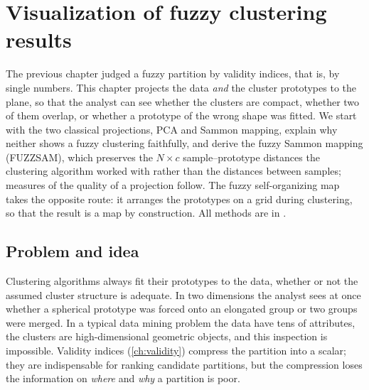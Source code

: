 \chapter[Visualization]{Visualization of fuzzy clustering results}\label{ch:visualization}
\begin{roadmap}
The previous chapter judged a fuzzy partition by validity indices, that is, by single numbers. This chapter projects the data \emph{and} the cluster prototypes to the plane, so that the analyst can see whether the clusters are compact, whether two of them overlap, or whether a prototype of the wrong shape was fitted. We start with the two classical projections, PCA and Sammon mapping, explain why neither shows a fuzzy clustering faithfully, and derive the fuzzy Sammon mapping (FUZZSAM), which preserves the $N\times c$ sample--prototype distances the clustering algorithm worked with rather than the distances between samples; measures of the quality of a projection follow. The fuzzy self-organizing map takes the opposite route: it arranges the prototypes on a grid during clustering, so that the result is a map by construction. All methods are in .
\end{roadmap}

\section{Problem and idea}\label{sec:viz:problem}

Clustering algorithms always fit their prototypes to the data, whether or not the assumed cluster structure is adequate. In two dimensions the analyst sees at once whether a spherical prototype was forced onto an elongated group or two groups were merged. In a typical data mining problem the data have tens of attributes, the clusters are high-dimensional geometric objects, and this inspection is impossible. Validity indices (\cref{ch:validity}) compress the partition into a scalar; they are indispensable for ranking candidate partitions, but the compression loses the information on \emph{where} and \emph{why} a partition is poor.

